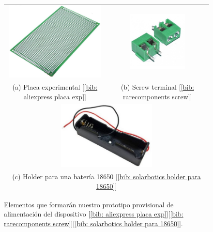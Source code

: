 \documentclass[12pt]{article}
\begin{document}
	\begin{figure}[h!]
		\begin{center}
			\begin{tabular}{cc}
				\includegraphics[width=50mm]{img/placa_exp.png} \label{Ejemplo placa experimental} &   \includegraphics[width=30mm]{img/screw.jpg}  \label{Ejemplo screw} \\
				(a) Placa experimental [\ref{bib: aliexpress placa exp}] & (b) Screw terminal [\ref{bib: rarecomponents screw}] \\[6pt]
				\multicolumn{2}{c}{\includegraphics[width=50mm]{img/18650_holder.png} \label{Ejemplo holder 18650} }\\
				\multicolumn{2}{c}{(c) Holder para una batería 18650 [\ref{bib: solarbotics holder para 18650}]}
			\end{tabular}
			\caption{Elementos que formarán nuestro prototipo provisional de alimentación del dispositivo [\ref{bib: aliexpress placa exp}][\ref{bib: rarecomponents screw}][\ref{bib: solarbotics holder para 18650}].}
			\label{Componentes prototipo}
		\end{center}
	\end{figure}
\end{document}
